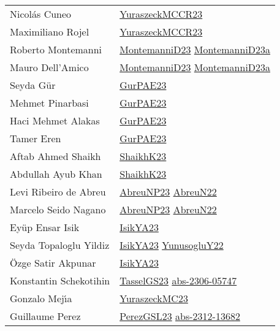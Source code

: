 {\begin{longtable}{p{4cm}p{15cm}}
Nicol{\'{a}}s Cuneo & \href{articles/YuraszeckMCCR23.pdf}{YuraszeckMCCR23}\cite{YuraszeckMCCR23} \\
Maximiliano Rojel & \href{articles/YuraszeckMCCR23.pdf}{YuraszeckMCCR23}\cite{YuraszeckMCCR23} \\
Roberto Montemanni & \href{articles/MontemanniD23.pdf}{MontemanniD23}\cite{MontemanniD23} \href{articles/MontemanniD23a.pdf}{MontemanniD23a}\cite{MontemanniD23a} \\
Mauro Dell'Amico & \href{articles/MontemanniD23.pdf}{MontemanniD23}\cite{MontemanniD23} \href{articles/MontemanniD23a.pdf}{MontemanniD23a}\cite{MontemanniD23a} \\
Seyda G{\"{u}}r & \href{articles/GurPAE23.pdf}{GurPAE23}\cite{GurPAE23} \\
Mehmet Pinarbasi & \href{articles/GurPAE23.pdf}{GurPAE23}\cite{GurPAE23} \\
Haci Mehmet Alakas & \href{articles/GurPAE23.pdf}{GurPAE23}\cite{GurPAE23} \\
Tamer Eren & \href{articles/GurPAE23.pdf}{GurPAE23}\cite{GurPAE23} \\
Aftab Ahmed Shaikh & \href{articles/ShaikhK23.pdf}{ShaikhK23}\cite{ShaikhK23} \\
Abdullah Ayub Khan & \href{articles/ShaikhK23.pdf}{ShaikhK23}\cite{ShaikhK23} \\
Levi Ribeiro de Abreu & \href{articles/AbreuNP23.pdf}{AbreuNP23}\cite{AbreuNP23} \href{articles/AbreuN22.pdf}{AbreuN22}\cite{AbreuN22} \\
Marcelo Seido Nagano & \href{articles/AbreuNP23.pdf}{AbreuNP23}\cite{AbreuNP23} \href{articles/AbreuN22.pdf}{AbreuN22}\cite{AbreuN22} \\
Ey{\"{u}}p Ensar Isik & \href{articles/IsikYA23.pdf}{IsikYA23}\cite{IsikYA23} \\
Seyda Topaloglu Yildiz & \href{articles/IsikYA23.pdf}{IsikYA23}\cite{IsikYA23} \href{articles/YunusogluY22.pdf}{YunusogluY22}\cite{YunusogluY22} \\
{\"{O}}zge Satir Akpunar & \href{articles/IsikYA23.pdf}{IsikYA23}\cite{IsikYA23} \\
Konstantin Schekotihin & \href{papers/TasselGS23.pdf}{TasselGS23}\cite{TasselGS23} \href{articles/abs-2306-05747.pdf}{abs-2306-05747}\cite{abs-2306-05747} \\
Gonzalo Mej{\'{\i}}a & \href{papers/YuraszeckMC23.pdf}{YuraszeckMC23}\cite{YuraszeckMC23} \\
Guillaume Perez & \href{papers/PerezGSL23.pdf}{PerezGSL23}\cite{PerezGSL23} \href{articles/abs-2312-13682.pdf}{abs-2312-13682}\cite{abs-2312-13682} \\

\end{longtable}}
